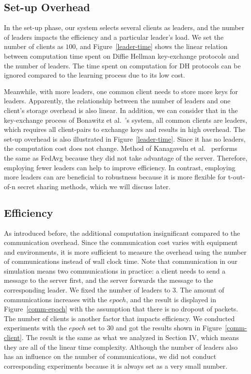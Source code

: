 \subsection{Set-up Overhead}
In the set-up phase, our system selects several clients as leaders, and the number of leaders impacts the efficiency and a particular leader's load. We set the number of clients as $100$, and Figure~\ref{leader-time} shows the linear relation between computation time spent on Diffie Hellman key-exchange protocols and the number of leaders. The time spent on computation for DH protocols can be ignored compared to the learning process due to its low cost.

Meanwhile, with more leaders, one common client needs to store more keys for leaders. Apparently, the relationship between the number of leaders and one client's storage overhead is also linear. In addition, we can consider that in the key-exchange process of Bonawitz et al.~\cite{Practical}'s system, all common clients are leaders, which requires all client-pairs to exchange keys and results in high overhead. The set-up overhead is also illustrated in Figure~\ref{leader-time}. Since it has no leaders, the computation cost does not change. Method of Kanagavelu et al.~\cite{Two-Phase} performs the same as FedAvg because they did not take advantage of the server. Therefore, employing fewer leaders can help to improve efficiency. In contrast, employing more leaders can are beneficial to robustness because it is more flexible for t-out-of-n secret sharing methods, which we will discuss later. 


\subsection{Efficiency}
As introduced before, the additional computation insignificant compared to the communication overhead. Since the communication cost varies with equipment and environments, it is more sufficient to measure the overhead using the number of communications instead of wall clock time. Note that communication in our simulation means two communications in practice: a client needs to send a message to the server first, and the server forwards the message to the corresponding leader. We fixed the number of leaders to 3. The amount of communications increases with the $epoch$, and the result is displayed in Figure~\ref{comm-epoch} with the assumption that there is no dropout of packets. The number of clients is another factor that impacts efficiency. We conducted experiments with the $epoch$ set to 30 and got the results shown in Figure~\ref{comm-client}. The result is the same as what we analyzed in Section IV, which means they are all of the linear time complexity. Although the number of leaders also has an influence on the number of communications, we did not conduct corresponding experiments because it is always set as a very small number. 


